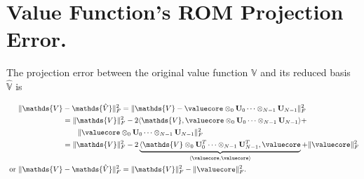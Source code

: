 \section{Value Function's ROM Projection Error.}
\label{app:ortho_proj_error}

The projection error between the original value function $\mathds{V}$ and its reduced basis $\mathds{\hat{V}}$ is

\begin{align}
	\|\mathds{V} &- \mathds{\hat{V}}\|_F^2 = \|\mathds{V} - \valuecore \otimes_0 \mathbf{U}_0  \cdots \otimes_{N-1} \mathbf{U}_{N-1} \|_F^2 \nonumber \\
	&= \|\mathds{V} \|_F^2 - 2 \langle \mathds{V}, \valuecore \otimes_0 \mathbf{U}_0   \cdots \otimes_{N-1} \mathbf{U}_{N-1}\rangle  + \nonumber \\
	& \qquad \|\valuecore \otimes_0 \mathbf{U}_0   \cdots \otimes_{N-1} \mathbf{U}_{N-1}\|_F^2  \\
	&= \|\mathds{V} \|_F^2 - 2 \underbrace{\langle \mathds{V} \otimes_0 \mathbf{U}_0^T   \cdots \otimes_{N-1} \mathbf{U}_{N-1}^T, \valuecore}_{\langle \valuecore, \valuecore \rangle}   +  \|\valuecore\|_F^2 \nonumber \\
	\text{ or } \|\mathds{V} &- \mathds{\hat{V}}\|_F^2	= \|\mathds{V} \|_F^2  -  \|\valuecore\|_F^2. 
	\label{eq:value_approx}
\end{align}
